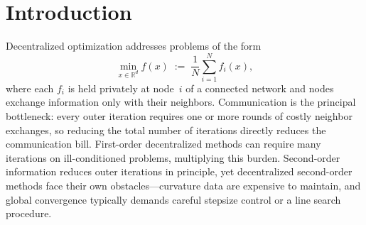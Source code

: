 \documentclass[11pt,a4paper]{article}
\newcommand{\R}{\mathbb{R}}
\begin{document}
\begin{abstract}
	Two practical variants accompany the theory:
	\textsc{CeDisGrem} compresses Hessian corrections to lower per-iteration
	communication, and \textsc{AdaDisGrem} adapts $M$ online via secant-based
	curvature estimation, removing the need for function-specific tuning.
	Experiments on nine objectives ($d{=}30$, 20 Monte~Carlo runs,
	six baselines including SONATA and Network-GIANT) show that
	the \textsc{DisGrem} family reaches high accuracy on most test
	cases (relative objective gap $\sim\!10^{-6}$--$10^{-15}$),
	while every baseline stagnates or diverges on at least one
	problem.
	A 100-run robustness study finds that \textsc{AdaDisGrem}
	attains the highest average success rate (80\,\%); ablation
	studies further quantify the trade-offs of Hessian compression
	and lazy updates.
\end{abstract}
	
	\section{Introduction}
	Decentralized optimization addresses problems of the form
	\begin{equation}\label{eq:intro_prob}
		\min_{x\in\R^d} f(x)\;:=\;\frac{1}{N}\sum_{i=1}^N f_i(x),
	\end{equation}
	where each $f_i$ is held privately at node~$i$ of a connected network
	and nodes exchange information only with their neighbors.
	Communication is the principal bottleneck: every outer iteration
	requires one or more rounds of costly neighbor exchanges, so
	reducing the total number of iterations directly reduces the
	communication bill.
	First-order decentralized methods can require many iterations on
	ill-conditioned problems, multiplying this burden.
	Second-order information reduces outer iterations in principle,
	yet decentralized second-order methods face their own
	obstacles---curvature data are expensive to maintain, and global
	convergence typically demands careful stepsize control or a
	line search procedure.
	
\end{document}
